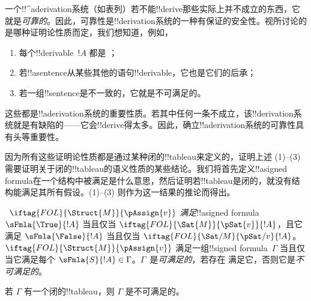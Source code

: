 \documentclass[../../../include/open-logic-section]{subfiles}
\begin{document}
      {}
      {}


\begin{explain}
一个!!^a{derivation}系统（如表列）若不能!!{derive}那些实际上并不成立的东西，它就是\emph{可靠的}。因此，可靠性是!!{derivation}系统的一种有保证的安全性。视所讨论的是哪种证明论性质而定，我们想知道，例如，
\begin{enumerate}
\item 每个!!{derivable}~$!A$ 都是 ；
\item 若!!a{sentence}从某些其他的语句!!{derivable}，它也是它们的后承；
\item 若一组!!{sentence}是不一致的，它就是不可满足的。
\end{enumerate}
这些都是!!a{derivation}系统的重要性质。若其中任何一条不成立，该!!{derivation}系统就是有缺陷的——它会!!{derive}得太多。因此，确立!!a{derivation}系统的可靠性具有头等重要性。

因为所有这些证明论性质都是通过某种闭的!!{tableau}来定义的，证明上述 (1)--(3) 需要证明关于闭的!!{tableau}的语义性质的某些结论。我们将首先定义!!a{signed formula}在一个结构中被满足是什么意思，然后证明若!!{tableau}是闭的，就没有结构能满足其所有假设。(1)--(3) 则作为这一结果的推论而得出。
\end{explain}

\begin{defn}
~$\iftag{FOL}{\Struct{M}}{\pAssign{v}}$
\emph{满足}!!a{signed formula} $\sFmla{\True}{!A}$ 当且仅当
$\iftag{FOL}{\Sat{M}}{\pSat{v}}{!A}$，且它满足
$\sFmla{\False}{!A}$ 当且仅当
$\iftag{FOL}{\Sat/{M}}{\pSat/{v}}{!A}$。$\iftag{FOL}{\Struct{M}}{\pAssign{v}}$
满足一组!!{signed formula}~$\Gamma$ 当且仅当它满足每个
$\sFmla{S}{!A} \in \Gamma$。$\Gamma$~是\emph{可满足的}，若存在
 满足它，否则它是\emph{不可满足的}。
\end{defn}

\begin{thm}[可靠性]
  若 $\Gamma$ 有一个闭的!!{tableau}，则 $\Gamma$ 是不可满足的。
\end{thm}
\end{document}
